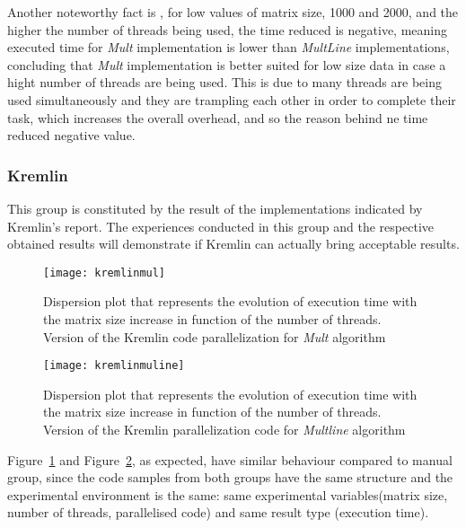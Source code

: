 Another noteworthy fact is , for low values of matrix size, 1000 and 2000, and the higher the number of threads being used, the time reduced is negative, meaning executed time for \textit{Mult} implementation is lower than \textit{MultLine} implementations, concluding that  \textit{Mult} implementation is better suited for low size data in case a hight number of threads are being used. This is due to many threads are being used simultaneously and they are trampling each other in order to complete their task, which increases the overall overhead, and so the reason behind ne time reduced negative value.


\subsubsection{Kremlin}

This group is constituted by the result of the implementations indicated by Kremlin's report. The experiences conducted in this group and the respective obtained results will demonstrate if Kremlin can actually bring acceptable results. 

\begin{figure}[htb]
	\begin{center}
		\leavevmode
		\texttt{[image: kremlinmul]}
		\caption{Dispersion plot that represents the evolution of execution time with the matrix size increase in function of the number of threads. Version of the Kremlin code parallelization for \textsl{Mult} algorithm}
		\label{fig:kremlinmul}
	\end{center}
\end{figure}

\begin{figure}[htb]
	\begin{center}
		\leavevmode
		\texttt{[image: kremlinmuline]}
		\caption{Dispersion plot that represents the evolution of execution time with the matrix size increase in function of the number of threads. Version of the Kremlin parallelization code for \textsl{Multline} algorithm}
		\label{fig:kremlinmuline}
	\end{center}
\end{figure}

Figure~\ref{fig:kremlinmul} and Figure~\ref{fig:kremlinmuline}, as expected, have similar behaviour compared to manual group, since the code samples from both groups have the same structure and the experimental environment is the same: same experimental variables(matrix size, number of threads, parallelised code) and same result type (execution time).

